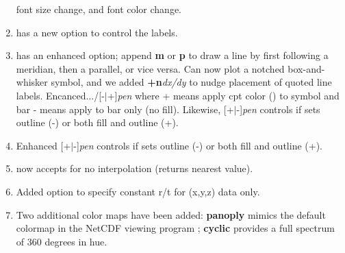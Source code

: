 \begin{enumerate}
font size change, and font color change.
\item {} has a new option  to control the labels.
\item {} has an enhanced  option; append {\bf m} or {\bf p} to draw a
line by first following a meridian, then a parallel, or vice versa. Can now plot a notched
box-and-whisker symbol, and we added {\bf +n}{\it dx/dy} to nudge placement of quoted line labels.
Encanced.../[-$|$+]{\it pen} where + means apply cpt color () to symbol and bar
- means apply to bar only (no fill).  Likewise, [+$|$-]{\it pen} controls
if  sets outline (-) or both fill and outline (+).
\item {} Enhanced [+$|$-]{\it pen} controls if  sets outline (-)
or both fill and outline (+).
\item {} now accepts  for no interpolation (returns nearest value).
\item {} Added option  to specify constant r/t for (x,y,z) data only.
\item Two additional color maps have been added: \textbf{panoply} mimics the default colormap in
the NetCDF viewing program ; \textbf{cyclic} provides a full spectrum of 360 degrees
in hue.
\end{enumerate}

